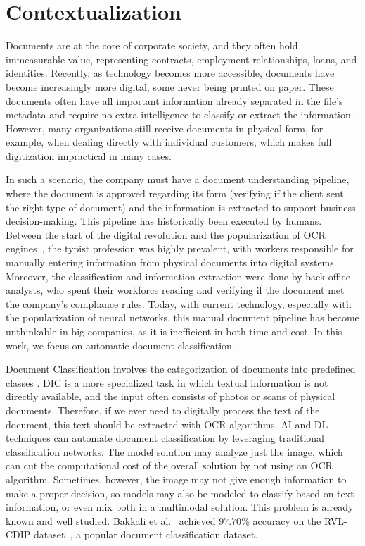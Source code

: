 \section{Contextualization}

Documents are at the core of corporate society, and they often hold immeasurable value, representing contracts, employment relationships, loans, and identities. Recently, as technology becomes more accessible, documents have become increasingly more digital, some never being printed on paper. These documents often have all important information already separated in the file's metadata and require no extra intelligence to classify or extract the information. However, many organizations still receive documents in physical form, for example, when dealing directly with individual customers, which makes full digitization impractical in many cases.

In such a scenario, the company must have a document understanding pipeline, where the document is approved regarding its form (verifying if the client sent the right type of document) and the information is extracted to support business decision-making. This pipeline has historically been executed by humans. Between the start of the digital revolution and the popularization of \gls{OCR} engines~\cite{kay_tesseract_2007, doctr2021}, the typist profession was highly prevalent, with workers responsible for manually entering information from physical documents into digital systems. Moreover, the classification and information extraction were done by back office analysts, who spent their workforce reading and verifying if the document met the company's compliance rules. Today, with current technology, especially with the popularization of neural networks, this manual document pipeline has become unthinkable in big companies, as it is inefficient in both time and cost. In this work, we focus on automatic document classification.


Document Classification involves the categorization of documents into predefined classes \cite{liu_document_2021}. \gls{DIC} is a more specialized task in which textual information is not directly available, and the input often consists of photos or scans of physical documents. Therefore, if we ever need to digitally process the text of the document, this text should be extracted with \gls{OCR} algorithms. \gls{AI} and \gls{DL} techniques can automate document classification by leveraging traditional classification networks. The model solution may analyze just the image, which can cut the computational cost of the overall solution by not using an \gls{OCR} algorithm. Sometimes, however, the image may not give enough information to make a proper decision, so models may also be modeled to classify based on text information, or even mix both in a multimodal solution. This problem is already known and well studied. Bakkali et al.~\cite{bakkali_eaml_2021} achieved $97.70\%$ accuracy on the RVL-CDIP dataset~\cite{harley2015rvlcdip}, a popular document classification dataset.

